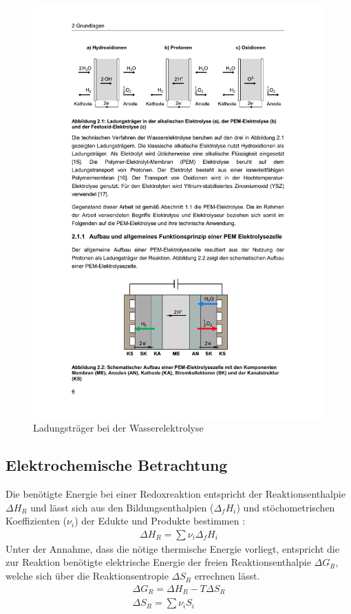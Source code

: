 \begin{figure}[h]
	\centering
		\includegraphics[scale=1]{Figures/LadungstraegerBeiDerWasserelektrolyse}
		\caption{Ladungsträger bei der 
		Wasserelektrolyse \citep{tjarks_pem-elektrolyse-systeme_2017}}
\label{fig:LadungstraegerBeiDerWasserelektrolyse}	
\end{figure}

\subsection{Elektrochemische Betrachtung}
\label{subsec:Energetische Betrachtung}
Die benötigte Energie bei einer Redoxreaktion entspricht der Reaktionsenthalpie $\Delta H_R$ und lässt sich aus den Bildungsenthalpien ($\Delta_f H_i$) und stöchometrischen Koeffizienten ($\nu_i$) der Edukte und Produkte bestimmen \citep{falcao_review_2020,brauns_alkaline_2020}:
\begin{align}
 	\Delta H_R = \sum{\nu_i \Delta_f H_i}
\end{align}
Unter der Annahme, dass die nötige thermische Energie vorliegt, entspricht die zur Reaktion benötigte elektrische Energie  der freien Reaktionsenthalpie $\Delta G_R$, welche sich über die Reaktionsentropie $\Delta S_R$ errechnen lässt.
\begin{align}
	\Delta G_R = \Delta H_R - T\Delta S_R \\
 	\Delta S_R = \sum{\nu_i S_i}
\end{align}

